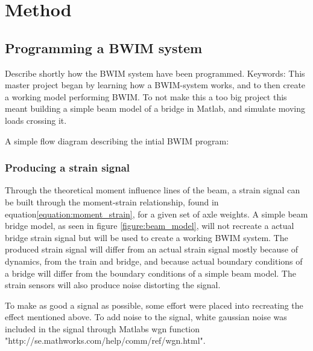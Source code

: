 \section{Method}

\subsection{Programming a BWIM system}
Describe shortly how the BWIM system have been programmed.
Keywords:
This master project began by learning how a BWIM-system works, and to then create a working model performing BWIM. To not make this a too big project this meant building a simple beam model of a bridge in Matlab, and simulate moving loads crossing it.

A simple flow diagram describing the intial BWIM program:
\begin{figure}[H]
	\centering
	
\end{figure}


\subsubsection{Producing a strain signal}
Through the theoretical moment influence lines of the beam, a strain signal can be built through the moment-strain relationship, found in equation\ref{equation:moment_strain}, for a given set of axle weights. A simple beam bridge model, as seen in figure \ref{figure:beam_model}, will not recreate a actual bridge strain signal but will be used to create a working BWIM system. The produced strain signal will differ from an actual strain signal mostly because of dynamics, from the train and bridge, and because actual boundary conditions of a bridge will differ from the boundary conditions of a simple beam model. The strain sensors will also produce noise distorting the signal.

To make as good a signal as possible, some effort were placed into recreating the effect mentioned above. To add noise to the signal, white gaussian noise was included in the signal through Matlabs wgn function "http://se.mathworks.com/help/comm/ref/wgn.html".


